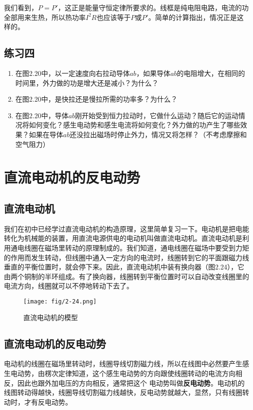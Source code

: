 我们看到，$P=P'$，这正是能量守恒定律所要求的。线框是纯电阻电路，电流的功全部用来生热，所以热功率$I^2R$也应该等于$P$或$P'$。简单的计算指出，情况正是这样的。

\subsection*{练习四}
\begin{enumerate}
    \item 在图2.20中，以一定速度向右拉动导体$ab$，如果导体$ab$的电阻增大，在相同的时间里，外力做的功是增大还是减小？为什么？
    \item 在图2.20中，是快拉还是慢拉所需的功率多？为什么？
    \item 在图2.20中，导体$ab$刚开始受到恒力拉动时，它做什么运动？随后它的运动情况将如何变化？感生电动势和感生电流将如何变化？外力做的功产生了哪些效果？如果在导体$ab$还没拉出磁场时停止外力，情况又将怎样？（不考虑摩擦和空气阻力）
\end{enumerate}

\section{直流电动机的反电动势}
\subsection{直流电动机}

我们在初中已经学过直流电动机的构造原理，这里简单复习一下。电动机是把电能转化为机械能的装置，用直流电源供电的电动机叫做直流电动机。直流电动机是利用通电线圈在磁场里转动的原理制成的。我们知道，通电线圈在磁场中要受到力矩的作用而发生转动，但线圈中通入一定方向的电流时，线圈转到它的平面跟磁力线垂直的平衡位置时，就会停下来。因此，直流电动机中装有换向器（图2.24），它由两个铜制的半环组成。有了换向器，线圈转到平衡位置时可以自动改变线圈里的电流方向，线圈就可以不停地转动下去了。
\begin{figure}[htp]\centering
\texttt{[image: fig/2-24.png]}
\caption{直流电动机的模型}
\end{figure}

\subsection{直流电动机的反电动势}

电动机的线圈在磁场里转动时，线圈导线切割磁力线，所以在线图中必然要产生感生电动势，由楞次定律知道，这个感生电动势的方向跟使线圈转动的电流方向相反，因此也跟外加电压的方向相反，通常把这个
电动势叫做\textbf{反电动势}。电动机的线图转动得越快，线圈导线切割磁力线越快，反电动势就越大，显然，只有线圈转动时，才有反电动势。

